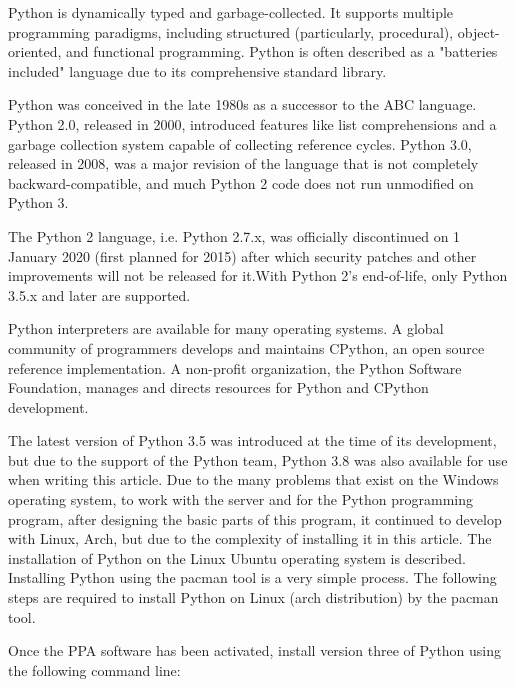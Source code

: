 Python is dynamically typed and garbage-collected. It supports multiple programming paradigms, including structured (particularly, procedural), object-oriented, and functional programming. Python is often described as a "batteries included" language due to its comprehensive standard library.

Python was conceived in the late 1980s as a successor to the ABC language. Python 2.0, released in 2000, introduced features like list comprehensions and a garbage collection system capable of collecting reference cycles. Python 3.0, released in 2008, was a major revision of the language that is not completely backward-compatible, and much Python 2 code does not run unmodified on Python 3.

The Python 2 language, i.e. Python 2.7.x, was officially discontinued on 1 January 2020 (first planned for 2015) after which security patches and other improvements will not be released for it.With Python 2's end-of-life, only Python 3.5.x and later are supported.

Python interpreters are available for many operating systems. A global community of programmers develops and maintains CPython, an open source reference implementation. A non-profit organization, the Python Software Foundation, manages and directs resources for Python and CPython development.\textcite{python}

The latest version of Python 3.5 was introduced at the time of its development, but due to the support of the Python team, Python 3.8 was also available for use when writing this article.
Due to the many problems that exist on the Windows operating system, to work with the server and for the Python programming program, after designing the basic parts of this program, it continued to develop with Linux, Arch, but due to the complexity of installing it in this article. The installation of Python on the Linux Ubuntu operating system is described.
Installing Python using the pacman tool is a very simple process. The following steps are required to install Python on Linux (arch distribution) by the pacman tool.
\linebreak

{}
\linebreak

Once the PPA software has been activated, install version three of Python using the following command line:
\newline


